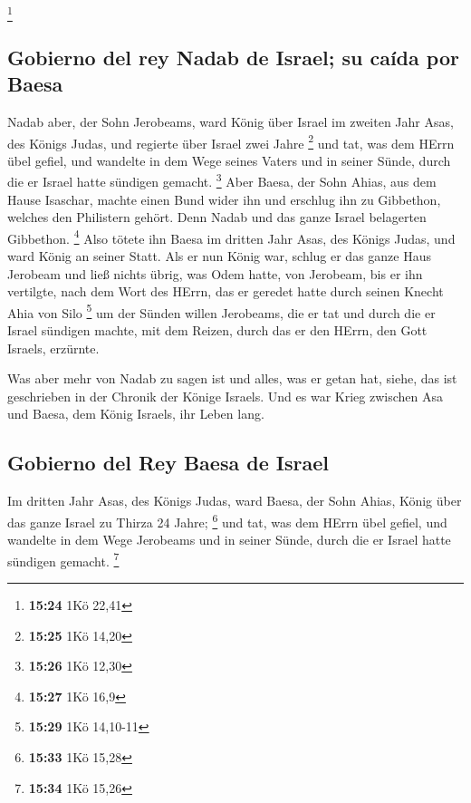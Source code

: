 \footnote{\textbf{15:24} 1Kö 22,41}

\hypertarget{gobierno-del-rey-nadab-de-israel-su-cauxedda-por-baesa}{%
\subsection{Gobierno del rey Nadab de Israel; su caída por
Baesa}\label{gobierno-del-rey-nadab-de-israel-su-cauxedda-por-baesa}}

 Nadab aber, der Sohn Jerobeams, ward König über Israel
im zweiten Jahr Asas, des Königs Judas, und regierte über Israel zwei
Jahre \footnote{\textbf{15:25} 1Kö 14,20}  und tat, was
dem HErrn übel gefiel, und wandelte in dem Wege seines Vaters und in
seiner Sünde, durch die er Israel hatte sündigen gemacht. \footnote{\textbf{15:26}
  1Kö 12,30}  Aber Baesa, der Sohn Ahias, aus dem Hause
Isaschar, machte einen Bund wider ihn und erschlug ihn zu Gibbethon,
welches den Philistern gehört. Denn Nadab und das ganze Israel
belagerten Gibbethon. \footnote{\textbf{15:27} 1Kö 16,9} 
Also tötete ihn Baesa im dritten Jahr Asas, des Königs Judas, und ward
König an seiner Statt.  Als er nun König war, schlug er
das ganze Haus Jerobeam und ließ nichts übrig, was Odem hatte, von
Jerobeam, bis er ihn vertilgte, nach dem Wort des HErrn, das er geredet
hatte durch seinen Knecht Ahia von Silo \footnote{\textbf{15:29} 1Kö
  14,10-11}  um der Sünden willen Jerobeams, die er tat
und durch die er Israel sündigen machte, mit dem Reizen, durch das er
den HErrn, den Gott Israels, erzürnte.

 Was aber mehr von Nadab zu sagen ist und alles, was er
getan hat, siehe, das ist geschrieben in der Chronik der Könige Israels.
 Und es war Krieg zwischen Asa und Baesa, dem König
Israels, ihr Leben lang.

\hypertarget{gobierno-del-rey-baesa-de-israel}{%
\subsection{Gobierno del Rey Baesa de
Israel}\label{gobierno-del-rey-baesa-de-israel}}

 Im dritten Jahr Asas, des Königs Judas, ward Baesa, der
Sohn Ahias, König über das ganze Israel zu Thirza 24 Jahre; \footnote{\textbf{15:33}
  1Kö 15,28}  und tat, was dem HErrn übel gefiel, und
wandelte in dem Wege Jerobeams und in seiner Sünde, durch die er Israel
hatte sündigen gemacht. \footnote{\textbf{15:34} 1Kö 15,26}

